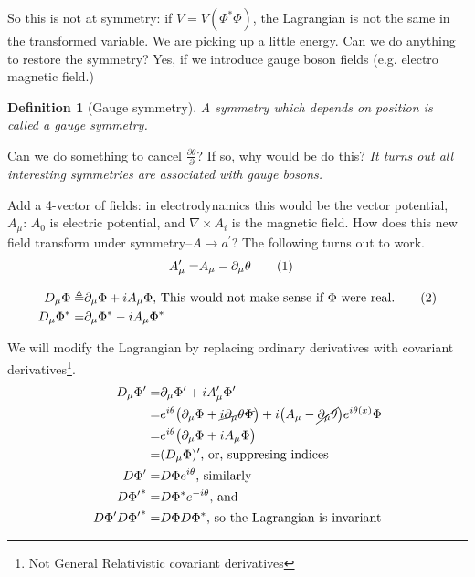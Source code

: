 \documentclass[]{article}
\newcommand\numberthis{\addtocounter{equation}{1}\tag{\theequation}}
\newtheorem{defn}[thm]{Definition}
\begin{document}
So this is not at symmetry: if $V=V(\Phi^*\Phi)$, the Lagrangian is not the same in the transformed variable. We are picking up a little energy. Can we do anything to restore the symmetry? Yes, if we introduce gauge boson fields (e.g. electro magnetic field.)

\begin{defn}[Gauge symmetry]
	A symmetry which depends on position is called a gauge symmetry.
\end{defn}

Can we do something to cancel $\frac{\partial \theta}{\partial}$? If so, why would be do this? \emph{It turns out all interesting symmetries are associated with gauge bosons.}

Add a 4-vector of fields: in electrodynamics this would be the vector potential, $A_\mu$: $A_0$ is electric potential, and $\nabla \times A_i$ is the magnetic field. How does this new field transform under symmetry--$A \rightarrow a^\prime$? The following turns out to work.
\begin{align*}
	A^\prime_\mu =& A_\mu - \partial_\mu \theta \numberthis \label{eq:gauge:field}
\end{align*}



\begin{align*}
	D_\mu \Phi \triangleq& \partial_\mu \Phi + i A_\mu \Phi \text{, This would not make sense if $\Phi$ were real.} \numberthis \label{eq:covariant:derivative}\\
	D_\mu \Phi^* =& \partial_\mu \Phi^* - i A_\mu \Phi^*
\end{align*}

We will modify the Lagrangian by replacing ordinary derivatives with covariant derivatives\footnote{Not General Relativistic covariant derivatives}.
\begin{align*}
	D_\mu \Phi^\prime =& \partial_\mu \Phi^\prime + i A_\mu^\prime \Phi^\prime\\
	=& e^{i\theta}\big(\partial_\mu \Phi +\cancel{i\partial_\mu \theta \Phi} \big) + i \big(A_\mu -\cancel{ \partial_\mu \theta} \big) e^{i \theta(x)} \Phi\\
	=& e^{i\theta} \big( \partial_\mu \Phi +i A_\mu \Phi \big)\\
	=& (D_\mu \Phi)^\prime \text{, or, suppresing indices}\\
	D \Phi^\prime =&  D \Phi  e^{i \theta} \text{, similarly}\\
	D {\Phi^\prime}^* =& D {\Phi}^*  e^{-i \theta} \text{, and}\\
	D \Phi^\prime D {\Phi^\prime}^*=& D \Phi D {\Phi}^* \text{, so the Lagrangian is invariant}
\end{align*}
\end{document}
